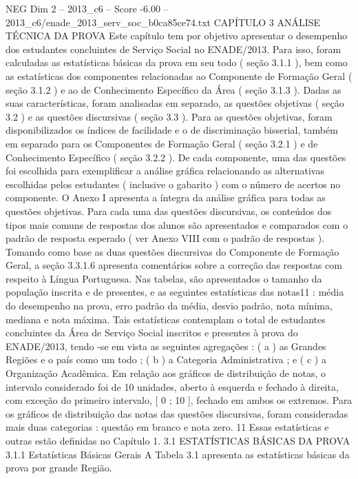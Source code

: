 \begin{textsample}{NEG Dim 2 – 2013\_c6 – Score -6.00 – 2013\_c6/enade\_2013\_serv\_soc\_b0ca85ce74.txt}  \label{ex:f2_neg_051}
CAPÍTULO 3 ANÁLISE TÉCNICA DA PROVA Este capítulo tem por objetivo apresentar o desempenho dos estudantes concluintes de Serviço Social no ENADE/2013.
Para isso, foram calculadas as estatísticas básicas da prova em seu todo ( seção 3.1.1 ), bem como as estatísticas dos componentes relacionadas ao Componente de Formação Geral ( seção 3.1.2 ) e ao de Conhecimento Específico da Área ( seção 3.1.3 ).
Dadas as suas características, foram analisadas em separado, as questões objetivas ( seção 3.2 ) e as questões discursivas ( seção 3.3 ).
Para as questões objetivas, foram disponibilizados os índices de facilidade e o de discriminação bisserial, também em separado para os Componentes de Formação Geral ( seção 3.2.1 ) e de Conhecimento Específico ( seção 3.2.2 ).
De cada componente, uma das questões foi escolhida para exemplificar a análise gráfica relacionando as alternativas escolhidas pelos estudantes ( inclusive o gabarito ) com o número de acertos no componente.
O Anexo I apresenta a íntegra da análise gráfica para todas as questões objetivas.
Para cada uma das questões discursivas, os conteúdos dos tipos mais comuns de respostas dos alunos são apresentados e comparados com o padrão de resposta esperado ( ver Anexo VIII com o padrão de respostas ).
Tomando como base as duas questões discursivas do Componente de Formação Geral, a seção 3.3.1.6 apresenta comentários sobre a correção das respostas com respeito à Língua Portuguesa.
Nas tabelas, são apresentados o tamanho da população inscrita e de presentes, e as seguintes estatísticas das notas11 : média do desempenho na prova, erro padrão da média, desvio padrão, nota mínima, mediana e nota máxima.
Tais estatísticas contemplam o total de estudantes concluintes da Área de Serviço Social inscritos e presentes à prova do ENADE/2013, tendo -se em vista as seguintes agregações : ( a ) as Grandes Regiões e o país como um todo ; ( b ) a Categoria Administrativa ; e ( c ) a Organização Acadêmica.
Em relação aos gráficos de distribuição de notas, o intervalo considerado foi de 10 unidades, aberto à esquerda e fechado à direita, com exceção do primeiro intervalo, [ 0 ; 10 ], fechado em ambos os extremos.
Para os gráficos de distribuição das notas das questões discursivas, foram consideradas mais duas categorias : questão em branco e nota zero. 11 Essas estatísticas e outras estão definidas no Capítulo 1. 3.1 ESTATÍSTICAS BÁSICAS DA PROVA 3.1.1 Estatísticas Básicas Gerais A Tabela 3.1 apresenta as estatísticas básicas da prova por grande Região.

\end{textsample}
